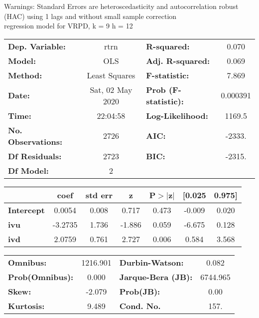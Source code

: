 Warnings: \newline
 [1] Standard Errors are heteroscedasticity and autocorrelation robust (HAC) using 1 lags and without small sample correction\\ 

regression model for VRPD, k = 9 h = 12\begin{center}
\begin{tabular}{lclc}
\toprule
\textbf{Dep. Variable:}    &       rtrn       & \textbf{  R-squared:         } &     0.070   \\
\textbf{Model:}            &       OLS        & \textbf{  Adj. R-squared:    } &     0.069   \\
\textbf{Method:}           &  Least Squares   & \textbf{  F-statistic:       } &     7.869   \\
\textbf{Date:}             & Sat, 02 May 2020 & \textbf{  Prob (F-statistic):} &  0.000391   \\
\textbf{Time:}             &     22:04:58     & \textbf{  Log-Likelihood:    } &    1169.5   \\
\textbf{No. Observations:} &        2726      & \textbf{  AIC:               } &    -2333.   \\
\textbf{Df Residuals:}     &        2723      & \textbf{  BIC:               } &    -2315.   \\
\textbf{Df Model:}         &           2      & \textbf{                     } &             \\
\bottomrule
\end{tabular}
\begin{tabular}{lcccccc}
                   & \textbf{coef} & \textbf{std err} & \textbf{z} & \textbf{P$> |$z$|$} & \textbf{[0.025} & \textbf{0.975]}  \\
\midrule
\textbf{Intercept} &       0.0054  &        0.008     &     0.717  &         0.473        &       -0.009    &        0.020     \\
\textbf{ivu}       &      -3.2735  &        1.736     &    -1.886  &         0.059        &       -6.675    &        0.128     \\
\textbf{ivd}       &       2.0759  &        0.761     &     2.727  &         0.006        &        0.584    &        3.568     \\
\bottomrule
\end{tabular}
\begin{tabular}{lclc}
\textbf{Omnibus:}       & 1216.901 & \textbf{  Durbin-Watson:     } &    0.082  \\
\textbf{Prob(Omnibus):} &   0.000  & \textbf{  Jarque-Bera (JB):  } & 6744.965  \\
\textbf{Skew:}          &  -2.079  & \textbf{  Prob(JB):          } &     0.00  \\
\textbf{Kurtosis:}      &   9.489  & \textbf{  Cond. No.          } &     157.  \\
\bottomrule
\end{tabular}
\end{center}

